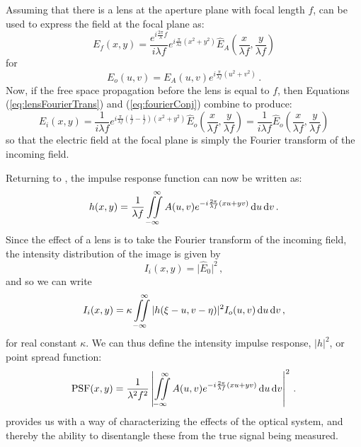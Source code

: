 Assuming that there is a lens at the aperture plane with focal length $f$,  can be used to express the field at the focal plane as:
\begin{equation}\label{eq:lensFourierTrans}
E_f(x,y) = \frac{e^{i\frac{2\pi}{\lambda}f}}{i\lambda f}e^{i\frac{\pi}{\lambda z}\left(x^2 + y^2\right)} \hat{E}_A\left(\frac{x}{\lambda f}, \frac{y}{\lambda f}\right)
\end{equation}
for
\begin{equation}
E_o(u,v) = E_A(u,v)e^{i\frac{\pi}{\lambda f}\left(u^2 + v^2\right)} \,. 
\end{equation}
Now, if the free space propagation before the lens is equal to $f$, then Equations (\ref{eq:lensFourierTrans}) and (\ref{eq:fourierConj}) combine to produce:
\begin{equation}
E_i(x,y) = \frac{1}{i\lambda f}e^{i\frac{\pi}{\lambda f}\left( \frac{1}{f} - \frac{1}{f}\right)\left(x^2 + y^2\right)} \hat{E}_o\left(\frac{x}{\lambda f}, \frac{y}{\lambda f}\right) =  \frac{1}{i\lambda f} \hat{E}_o\left(\frac{x}{\lambda f}, \frac{y}{\lambda f}\right)
\end{equation}
so that the electric field at the focal plane is simply the Fourier transform of the incoming field.

Returning to , the impulse response function can now be written as:
\begin{equation}
h(x,y) = \frac{1}{\lambda f} \iint\limits_{-\infty}^{\quad \infty} A(u,v) e^{-i\frac{2\pi}{\lambda f}\left(xu +yv\right)} \,\mathrm{d}u\,\mathrm{d}v \,.
\end{equation}
Since the effect of a lens is to take the Fourier transform of the incoming field, the intensity distribution of the image is given by
\begin{equation}
I_i(x,y) = \vert \hat{E}_0\vert^2 \,,
\end{equation}
and so we can write
\begin{equation}
I_i(x,y) = \kappa \iint\limits_{-\infty}^{\quad \infty} \vert h(\xi - u, v-\eta) \vert^2 I_o(u,v) \,\mathrm{d}u\,\mathrm{d}v \,,
\end{equation}
for real constant $\kappa$.
We can thus define the intensity impulse response, $\vert h\vert^2$, or point spread function:
\begin{equation}\label{eq:PSFdef}
\mathrm{PSF} (x,y) = \frac{1}{\lambda^2 f^2} \left\vert\iint\limits_{-\infty}^{\quad \infty} A(u,v) e^{-i\frac{2\pi}{\lambda f}\left(xu +yv\right)} \,\mathrm{d}u\,\mathrm{d}v \right\vert^2 \,.
\end{equation}
 provides us with a way of characterizing the effects of the optical system, and thereby the ability to disentangle these from the true signal being measured.

